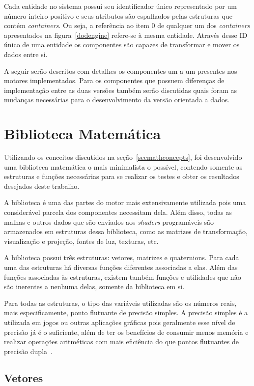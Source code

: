 Cada entidade no sistema possui seu identificador único representado 
por um número inteiro positivo e seus atributos são espalhados pelas estruturas 
que contém \textit{containers}. Ou seja, a referência ao item $0$ 
de qualquer um dos \textit{containers} apresentados na 
figura~\ref{dodengine} refere-se à mesma entidade. Através desse 
ID único de uma entidade os componentes são capazes de transformar 
e mover os dados entre si.

A seguir serão descritos com detalhes os componentes um a um 
presentes nos motores implementados. Para os componentes que 
possuem diferenças de implementação entre as duas versões também 
serão discutidas quais foram as mudanças necessárias para o 
desenvolvimento da versão orientada a dados.

\section{Biblioteca Matemática}

Utilizando os conceitos discutidos na seção~\ref{secmathconcepts}, foi 
desenvolvido uma biblioteca matemática o mais minimalista o possível, contendo somente 
as estruturas e funções necessárias para se realizar os testes e obter os resultados 
desejados deste trabalho. 

A biblioteca é uma das partes do motor mais extensivamente utilizada pois uma 
considerável parcela dos componentes necessitam dela. Além disso, todas as 
malhas e outros dados que são enviados aos \textit{shaders} programáveis são armazenados em 
estruturas dessa biblioteca, como as matrizes de transformação, visualização e projeção, 
fontes de luz, texturas, etc.

A biblioteca possui três estruturas: vetores, matrizes e quaternions. Para cada uma das 
estruturas há diversas funções diferentes associadas a elas. Além das funções associadas 
às estruturas, existem também funções e utilidades que não são inerentes a nenhuma delas, 
somente da biblioteca em si. 

Para todas as estruturas, o tipo das variáveis utilizadas são os números reais, mais 
especificamente, ponto flutuante de precisão simples. A precisão simples é a utilizada em 
jogos ou outras aplicações gráficas pois geralmente esse nível de precisão já é o 
suficiente, além de ter os benefícios de consumir menos memória e realizar operações 
aritméticas com mais eficiência do que pontos flutuantes de precisão 
dupla~\cite{Verth:2008}.

\subsection{Vetores}

